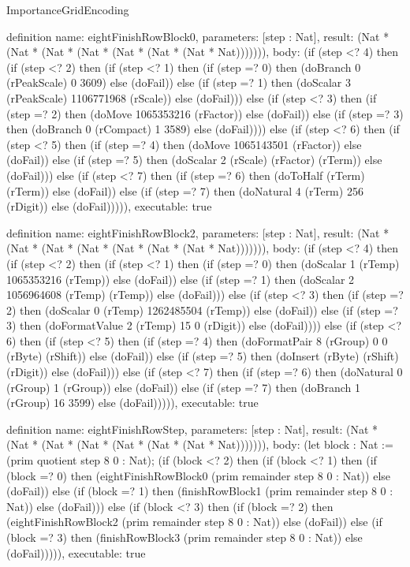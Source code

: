 \begin{lexlean}{ImportanceGridEncoding}
\begin{semanticmodule}
definition{
  name: eightFinishRowBlock0,
  parameters: [step : Nat],
  result: (Nat * (Nat * (Nat * (Nat * (Nat * (Nat * (Nat * Nat))))))),
  body: (if (step <? 4) then
      (if (step <? 2) then
      (if (step <? 1) then
      (if (step =? 0) then (doBranch 0 (rPeakScale) 0 3609) else (doFail)) else
      (if (step =? 1) then (doScalar 3 (rPeakScale) 1106771968 (rScale)) else (doFail))) else
      (if (step <? 3) then
      (if (step =? 2) then (doMove 1065353216 (rFactor)) else (doFail)) else
      (if (step =? 3) then (doBranch 0 (rCompact) 1 3589) else (doFail)))) else
      (if (step <? 6) then
      (if (step <? 5) then
      (if (step =? 4) then (doMove 1065143501 (rFactor)) else (doFail)) else
      (if (step =? 5) then (doScalar 2 (rScale) (rFactor) (rTerm)) else (doFail))) else
      (if (step <? 7) then
      (if (step =? 6) then (doToHalf (rTerm) (rTerm)) else (doFail)) else
      (if (step =? 7) then (doNatural 4 (rTerm) 256 (rDigit)) else (doFail))))),
  executable: true
}

definition{
  name: eightFinishRowBlock2,
  parameters: [step : Nat],
  result: (Nat * (Nat * (Nat * (Nat * (Nat * (Nat * (Nat * Nat))))))),
  body: (if (step <? 4) then
      (if (step <? 2) then
      (if (step <? 1) then
      (if (step =? 0) then (doScalar 1 (rTemp) 1065353216 (rTemp)) else (doFail)) else
      (if (step =? 1) then (doScalar 2 1056964608 (rTemp) (rTemp)) else (doFail))) else
      (if (step <? 3) then
      (if (step =? 2) then (doScalar 0 (rTemp) 1262485504 (rTemp)) else (doFail)) else
      (if (step =? 3) then (doFormatValue 2 (rTemp) 15 0 (rDigit)) else (doFail)))) else
      (if (step <? 6) then
      (if (step <? 5) then
      (if (step =? 4) then (doFormatPair 8 (rGroup) 0 0 (rByte) (rShift)) else (doFail)) else
      (if (step =? 5) then (doInsert (rByte) (rShift) (rDigit)) else (doFail))) else
      (if (step <? 7) then
      (if (step =? 6) then (doNatural 0 (rGroup) 1 (rGroup)) else (doFail)) else
      (if (step =? 7) then (doBranch 1 (rGroup) 16 3599) else (doFail))))),
  executable: true
}

definition{
  name: eightFinishRowStep,
  parameters: [step : Nat],
  result: (Nat * (Nat * (Nat * (Nat * (Nat * (Nat * (Nat * Nat))))))),
  body: (let block : Nat := (prim quotient step 8 0 : Nat); (if (block <? 2) then
      (if (block <? 1) then
      (if (block =? 0) then (eightFinishRowBlock0 (prim remainder step 8 0 : Nat)) else (doFail)) else
      (if (block =? 1) then (finishRowBlock1 (prim remainder step 8 0 : Nat)) else (doFail))) else
      (if (block <? 3) then
      (if (block =? 2) then (eightFinishRowBlock2 (prim remainder step 8 0 : Nat)) else (doFail)) else
      (if (block =? 3) then (finishRowBlock3 (prim remainder step 8 0 : Nat)) else (doFail))))),
  executable: true
}


\end{semanticmodule}
\end{lexlean}
